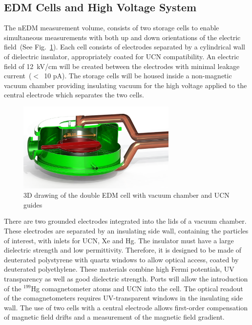 \subsection{ EDM Cells and High Voltage System}
The nEDM measurement volume, consists of two storage cells to enable
simultaneous measurements with both up and down orientations of the
electric field~(See Fig.~\ref{fig:HVcell}). Each cell consists of
electrodes separated by a cylindrical wall of dielectric insulator,
appropriately coated for UCN compatibility. An electric field of
12~kV/cm will be created between the electrodes with minimal leakage
current~($<$~10 pA).  The storage cells will be housed inside a
non-magnetic vacuum chamber providing insulating vacuum for the high
voltage applied to the central electrode which separates the two
cells.

\begin{figure}[h!]
  \centering
  \includegraphics[width=0.7\textwidth]{HVcell.png}
  \caption{3D drawing of the double EDM cell with vacuum chamber and
    UCN guides}
  \label{fig:HVcell}
\end{figure}



There are two grounded electrodes integrated into the lids of a vacuum
chamber. These electrodes are separated by an insulating side wall,
containing the particles of interest, with inlets for UCN, Xe and
Hg. The insulator must have a large dielectric strength and low
permittivity. Therefore, it is designed to be made of deuterated
polystyrene with quartz windows to allow optical access, coated by
deuterated polyethylene. These materials combine high Fermi
potentials, UV transparency as well as good dielectric strength.
Ports will allow the introduction of the $^{199}$Hg comagnetometer
atoms and UCN into the cell. The optical readout of the
comagnetometers requires UV-transparent windows in the insulating side
wall. The use of two cells with a central electrode allows first-order
compensation of magnetic field drifts and a measurement of the
magnetic field gradient.


